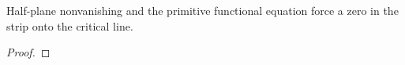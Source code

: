 \begin{theorem}
\label{crit}
\leanok
Half-plane nonvanishing and the primitive functional equation force a zero in the strip onto the critical line.
\end{theorem}
\begin{proof}
\leanok
\end{proof}
